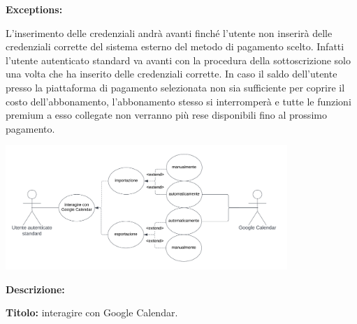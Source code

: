 \begin{listaPersonale}[UC]{}
\begin{listaPersonale2}[UC] {}

        \textbf{Exceptions:}
        \begin{enumerate}[label=\textbf{[exception \arabic{enumiii}]}, ref= \textbf{[exception \arabic{enumiii}]}]
             L'inserimento delle credenziali andrà avanti finché l'utente non inserirà delle credenziali corrette del sistema esterno del metodo di pagamento scelto. Infatti l'utente autenticato standard va avanti con la procedura della sottoscrizione solo una volta che ha inserito delle credenziali corrette.
             In caso il saldo dell'utente presso la piattaforma di pagamento selezionata non sia sufficiente per coprire il costo dell'abbonamento, l'abbonamento stesso si interromperà e tutte le funzioni premium a esso collegate non verranno più rese disponibili fino al prossimo pagamento.
        \end{enumerate}




        \begin{center}
            \includegraphics[width=0.8\textwidth]{img/Diagrammi/UseCases/GoogleCalendar.png}
        \end{center}

        \textbf{Descrizione:}

        \textbf{Titolo:} interagire con Google Calendar.


\end{listaPersonale2}
\end{listaPersonale}
